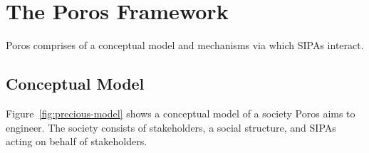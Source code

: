 \documentclass[11pt,          %
               phd,           %
               onehalfspacing %
               ]{ncsuthesis}
\newcommand{\frameworkB}{Poros\xspace}
\begin{document}
\section{The \frameworkB Framework}
\label{sec:precious-framework}

\frameworkB comprises of a conceptual model and mechanisms via which
SIPAs interact. 

\subsection{Conceptual Model}

Figure~\ref{fig:precious-model} shows a conceptual model of a society
\frameworkB aims to engineer. The society consists of stakeholders, a
social structure, and SIPAs acting on behalf of stakeholders.
\end{document}

